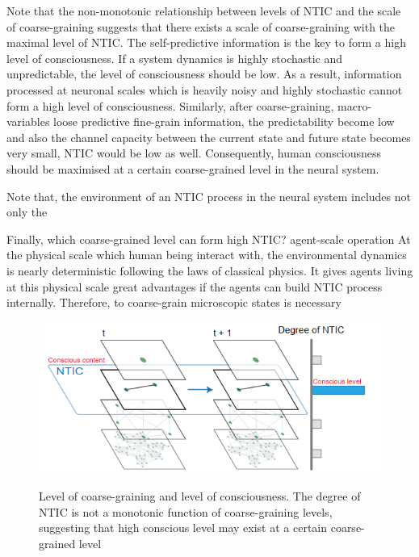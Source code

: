 \documentclass[utf8]{article}
\begin{document}
	    Note that the non-monotonic relationship between levels of NTIC and the scale of coarse-graining suggests that there exists a scale of coarse-graining with the maximal level of NTIC. The self-predictive information is the key to form a high level of consciousness. If a system dynamics is highly stochastic and unpredictable, the level of consciousness should be low. As a result, information processed at neuronal scales which is heavily noisy and highly stochastic cannot form a high level of consciousness. Similarly, after coarse-graining, macro-variables loose predictive fine-grain information, the predictability become low and also the channel capacity between the current state and future state becomes very small, NTIC would be low as well. Consequently, human consciousness should be maximised at a certain coarse-grained level in the neural system. 
	    
	    Note that, the environment of an NTIC process in the neural system includes not only the
        
        Finally, which coarse-grained level can form high NTIC? 
        agent-scale operation
        At the physical scale which human being interact with, the environmental dynamics is nearly deterministic following the laws of classical physics. It gives agents living at this physical scale great advantages if the agents can build NTIC process internally. Therefore, to coarse-grain microscopic states is necessary
	   
			
		\begin{figure}[H]				
    		\includegraphics[width=\textwidth]{WritingMaterials/Fig_temp/FoxitReader_2019-01-31_19-03-59.png}
    		\label{fig:LevelOfConsciousness}
    		\caption{Level of coarse-graining and level of consciousness. The degree of NTIC is not a monotonic function of coarse-graining levels, suggesting that high conscious level may exist at a certain coarse-grained level }
		\end{figure}
\end{document}
